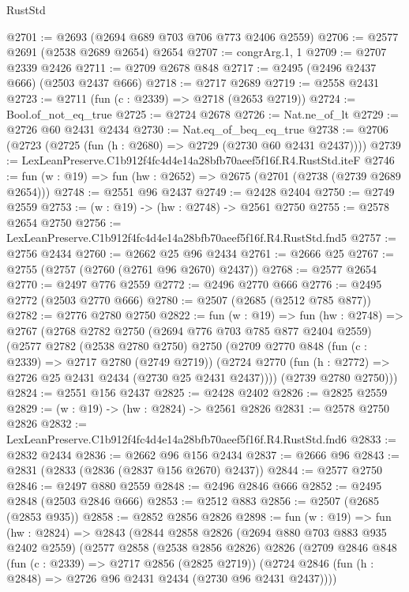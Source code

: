 \begin{lexlean}{RustStd}
\begin{coremodule}
@2701 := @2693 (@2694 @689 @703 @706 @773 @2406 @2559)
@2706 := @2577 @2691 (@2538 @2689 @2654) @2654
@2707 := congrArg.{1, 1}
@2709 := @2707 @2339 @2426
@2711 := @2709 @2678 @848
@2717 := @2495 (@2496 @2437 @666) (@2503 @2437 @666)
@2718 := @2717 @2689
@2719 := @2558 @2431
@2723 := @2711 (fun (c : @2339) => @2718 (@2653 @2719))
@2724 := Bool.of_not_eq_true
@2725 := @2724 @2678
@2726 := Nat.ne_of_lt
@2729 := @2726 @60 @2431 @2434
@2730 := Nat.eq_of_beq_eq_true
@2738 := @2706 (@2723 (@2725 (fun (h : @2680) => @2729 (@2730 @60 @2431 @2437))))
@2739 := LexLeanPreserve.C1b912f4fc4d4e14a28bfb70aeef5f16f.R4.RustStd.iteF
@2746 := fun (w : @19) => fun (hw : @2652) => @2675 (@2701 (@2738 (@2739 @2689 @2654)))
@2748 := @2551 @96 @2437
@2749 := @2428 @2404
@2750 := @2749 @2559
@2753 := (w : @19) -> (hw : @2748) -> @2561 @2750
@2755 := @2578 @2654 @2750
@2756 := LexLeanPreserve.C1b912f4fc4d4e14a28bfb70aeef5f16f.R4.RustStd.fnd5
@2757 := @2756 @2434
@2760 := @2662 @25 @96 @2434
@2761 := @2666 @25
@2767 := @2755 (@2757 (@2760 (@2761 @96 @2670) @2437))
@2768 := @2577 @2654
@2770 := @2497 @776 @2559
@2772 := @2496 @2770 @666
@2776 := @2495 @2772 (@2503 @2770 @666)
@2780 := @2507 (@2685 (@2512 @785 @877))
@2782 := @2776 @2780 @2750
@2822 := fun (w : @19) =>
  fun (hw : @2748) =>
  @2767
    (@2768
      @2782
      @2750
      (@2694 @776 @703 @785 @877 @2404 @2559)
      (@2577
        @2782
        (@2538 @2780 @2750)
        @2750
        (@2709
          @2770
          @848
          (fun (c : @2339) => @2717 @2780 (@2749 @2719))
          (@2724 @2770 (fun (h : @2772) => @2726 @25 @2431 @2434 (@2730 @25 @2431 @2437))))
        (@2739 @2780 @2750)))
@2824 := @2551 @156 @2437
@2825 := @2428 @2402
@2826 := @2825 @2559
@2829 := (w : @19) -> (hw : @2824) -> @2561 @2826
@2831 := @2578 @2750 @2826
@2832 := LexLeanPreserve.C1b912f4fc4d4e14a28bfb70aeef5f16f.R4.RustStd.fnd6
@2833 := @2832 @2434
@2836 := @2662 @96 @156 @2434
@2837 := @2666 @96
@2843 := @2831 (@2833 (@2836 (@2837 @156 @2670) @2437))
@2844 := @2577 @2750
@2846 := @2497 @880 @2559
@2848 := @2496 @2846 @666
@2852 := @2495 @2848 (@2503 @2846 @666)
@2853 := @2512 @883
@2856 := @2507 (@2685 (@2853 @935))
@2858 := @2852 @2856 @2826
@2898 := fun (w : @19) =>
  fun (hw : @2824) =>
  @2843
    (@2844
      @2858
      @2826
      (@2694 @880 @703 @883 @935 @2402 @2559)
      (@2577
        @2858
        (@2538 @2856 @2826)
        @2826
        (@2709
          @2846
          @848
          (fun (c : @2339) => @2717 @2856 (@2825 @2719))
          (@2724 @2846 (fun (h : @2848) => @2726 @96 @2431 @2434 (@2730 @96 @2431 @2437))))

\end{coremodule}
\end{lexlean}
